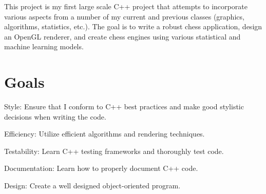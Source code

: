 This project is my first large scale C++ project that attempts to incorporate various aspects from a number of my current and previous classes (graphics, algorithms, statistics, etc.). The goal is to write a robust chess application, design an Open\+GL renderer, and create chess engines using various statistical and machine learning models.

\section*{Goals}


\begin{DoxyItemize}
\item Style\+: Ensure that I conform to C++ best practices and make good stylistic decisions when writing the code.
\item Efficiency\+: Utilize efficient algorithms and rendering techniques.
\item Testability\+: Learn C++ testing frameworks and thoroughly test code.
\item Documentation\+: Learn how to properly document C++ code.
\item Design\+: Create a well designed object-\/oriented program. 
\end{DoxyItemize}